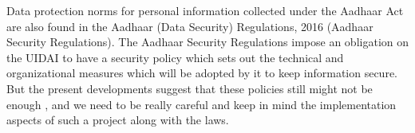 \par
Data protection norms for personal information collected under the Aadhaar Act are also found in the Aadhaar (Data Security) Regulations, 2016 (Aadhaar Security Regulations). The Aadhaar Security Regulations impose an obligation on the UIDAI to have a security policy which sets out the technical and organizational measures which will be adopted by it to keep information secure. But the present developments suggest that these policies still might not be enough \cite{aadharshw}, and we need to be really careful and keep in mind the implementation aspects of such a project along with the laws.